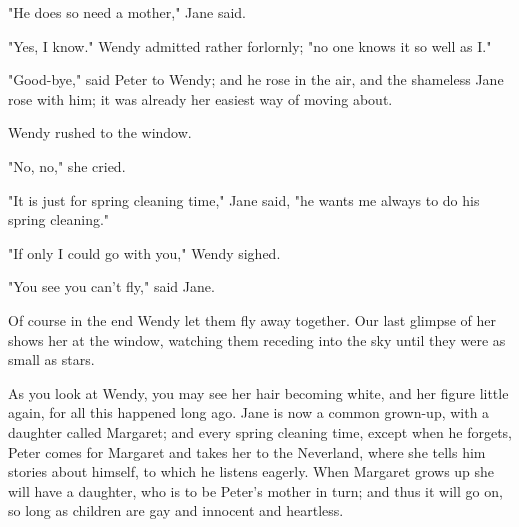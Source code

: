 "He does so need a mother," Jane said.


"Yes, I know." Wendy admitted rather forlornly; "no one knows it so well
as I."


"Good-bye," said Peter to Wendy; and he rose in the air, and the shameless
Jane rose with him; it was already her easiest way of moving about.


Wendy rushed to the window.


"No, no," she cried.


"It is just for spring cleaning time," Jane said, "he wants me always to
do his spring cleaning."


"If only I could go with you," Wendy sighed.


"You see you can't fly," said Jane.


Of course in the end Wendy let them fly away together. Our last glimpse of
her shows her at the window, watching them receding into the sky until
they were as small as stars.


As you look at Wendy, you may see her hair becoming white, and her figure
little again, for all this happened long ago. Jane is now a common
grown-up, with a daughter called Margaret; and every spring cleaning time,
except when he forgets, Peter comes for Margaret and takes her to the
Neverland, where she tells him stories about himself, to which he listens
eagerly. When Margaret grows up she will have a daughter, who is to be
Peter's mother in turn; and thus it will go on, so long as children are
gay and innocent and heartless.

